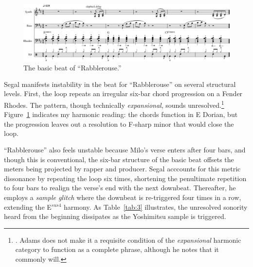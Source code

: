 \begin{figure}[h]
    \centering
    \includegraphics[width=\textwidth]{images/figures/chp 02/Figure-02.4-Rabblerouse-BB.pdf}
    \caption{The basic beat of ``Rabblerouse.''}
    \label{fig:3.1}
\end{figure}

Segal manifests instability in the beat for ``Rabblerouse'' on several structural levels. First, the loop repeats an irregular six-bar chord progression on a Fender Rhodes. The pattern, though technically \emph{expansional}, sounds unresolved.\footnote{\cite{kyleadamsHarmonicSyntacticMotivic2020}. Adams does not make it a requisite condition of the \emph{expansional} harmonic category to function as a complete phrase, although he notes that it commonly will.} Figure~\ref{fig:3.1} indicates my harmonic reading: the chords function in E Dorian, but the progression leaves out a resolution to F-sharp minor that would close the loop.

``Rabblerouse'' also feels unstable because Milo's verse enters after four bars, and though this is conventional, the six-bar structure of the basic beat offsets the meters being projected by rapper and producer. Segal acccounts for this metric dissonance by repeating the loop six times, shortening the penultimate repetition to four bars to realign the verse's end with the next downbeat. Thereafter, he employs a \emph{sample glitch} where the downbeat is re-triggered four times in a row, extending the E$^{sus4}$ harmony. As Table~\ref{tab:3} illustrates, the unresolved sonority heard from the beginning dissipates as the Yoshimitsu sample is triggered.

